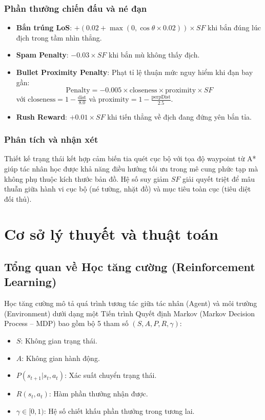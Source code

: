 \documentclass[a4paper, 12pt]{report}
\begin{document}
  \subsection{Phần thưởng chiến đấu và né đạn}
  \begin{itemize}
    \item \textbf{Bắn trúng LoS}: $+(0.02 + \max(0, \cos\theta \times 0.02)) \times SF$ khi bắn đúng lúc địch trong tầm nhìn thẳng.
    \item \textbf{Spam Penalty}: $-0.03 \times SF$ khi bắn mù không thấy địch.
    \item \textbf{Bullet Proximity Penalty}: Phạt tỉ lệ thuận mức nguy hiểm khi đạn bay gần:
    \begin{equation}
      \text{Penalty} = -0.005 \times \text{closeness} \times \text{proximity} \times SF
    \end{equation}
    với $\text{closeness} = 1 - \frac{\text{dist}}{8.0}$ và $\text{proximity} = 1 - \frac{\text{perpDist}}{2.5}$.
    \item \textbf{Rush Reward}: $+0.01 \times SF$ khi tiến thẳng về địch đang đứng yên bắn tỉa.
  \end{itemize}

  \subsection{Phân tích và nhận xét}

  Thiết kế trạng thái kết hợp cảm biến tia quét cục bộ với tọa độ waypoint từ A* giúp tác nhân học được khả năng điều hướng tối ưu trong mê cung phức tạp mà không phụ thuộc kích thước bản đồ. Hệ số suy giảm $SF$ giải quyết triệt để mâu thuẫn giữa hành vi cục bộ (né tường, nhặt đồ) và mục tiêu toàn cục (tiêu diệt đối thủ).

  \chapter{Cơ sở lý thuyết và thuật toán}

  \section{Tổng quan về Học tăng cường (Reinforcement Learning)}

  Học tăng cường mô tả quá trình tương tác giữa tác nhân (Agent) và môi trường (Environment) dưới dạng một Tiến trình Quyết định Markov (Markov Decision Process -- MDP) bao gồm bộ 5 tham số $(S, A, P, R, \gamma)$:
  \begin{itemize}
    \item $S$: Không gian trạng thái.
    \item $A$: Không gian hành động.
    \item $P(s_{t+1}|s_t, a_t)$: Xác suất chuyển trạng thái.
    \item $R(s_t, a_t)$: Hàm phần thưởng nhận được.
    \item $\gamma \in [0, 1)$: Hệ số chiết khấu phần thưởng trong tương lai.
  \end{itemize}
\end{document}
